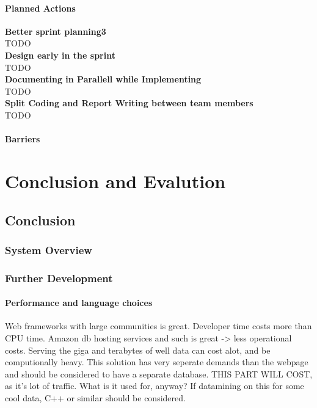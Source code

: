 \documentclass{report}
\begin{document}
\subsection{Planned Actions} \label{subsec:planned_act3}
\textbf{Better sprint planning3}\\
TODO\\
\textbf{Design early in the sprint}\\
TODO\\
\textbf{Documenting in Parallell while Implementing}\\
TODO\\
\textbf{Split Coding and Report Writing between team members}\\
TODO
\subsection{Barriers} \label{subsec:barriers3}



\part{Conclusion and Evalution}

\chapter{Conclusion} \label{cha:conclusion}
\newpage
\section{System Overview} \label{sec:system_overview}
\newpage
\section{Further Development} \label{sec:further_dev}
\subsection{Performance and language choices}
Web frameworks with large communities is great.
Developer time costs more than CPU time.
Amazon db hosting services and such is great -> less operational costs.
Serving the giga and terabytes of well data can cost alot, and be computionally heavy. This solution has very seperate demands than the webpage and should be considered to have a separate database. THIS PART WILL COST, as it's lot of traffic. What is it used for, anyway? If datamining on this for some cool data, C++ or similar should be considered. 
\end{document}
